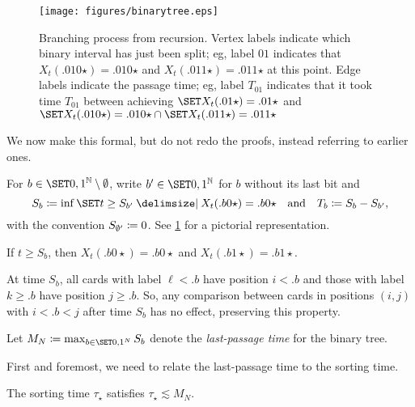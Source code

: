 \documentclass{article}
\newcommand{\mstar}{\mathord\star}
\begin{document}
\begin{figure}
\centering
\texttt{[image: figures/binarytree.eps]}
\caption{Branching process from recursion.
	Vertex labels indicate which binary interval has just been split;
	eg, label $01$ indicates that $X_t(.010\mstar) = .010\mstar$ and $X_t(.011\mstar) = .011\mstar$ at this point.
	Edge labels indicate the passage time;
	eg, label $T_{01}$ indicates that it took time $T_{01}$ between achieving $\set{ X_t(.01\mstar) = .01\mstar }$ and $\set{ X_t(.010\mstar) = .010\mstar } \cap \set{ X_t(.011\mstar) = .011\mstar }$%
	}
\label{fig:unif:binarytree}
\end{figure}

We now make this formal, but do not redo the proofs, instead referring to earlier ones.

\begin{defn}
For $b \in \set{0,1}^\mbn \setminus \emptyset$, write $b' \in \set{0,1}^\mbn$ for $b$ without its last bit
and
\[
	S_b
\cq
	\inf\set{ t \ge S_{b'} \given X_t(.b0\star) = .b0\star }
\Qand
	T_b
\cq
	S_b - S_{b'},
\]
with the convention $S_{\emptyset'} \coloneqq 0$.
See \cref{fig:unif:binarytree} for a pictorial representation.
\end{defn}

\begin{lem}
\label{res:unif:preservation}
If $t \ge S_b$, then $X_t(.b0\star) = .b0\star$ and $X_t(.b1\star) = .b1\star$.
\end{lem}

\begin{Proof}
At time $S_b$, all cards with label $\ell < .b$ have position $i < .b$ and those with label $k \ge .b$ have position $j \ge .b$.
So, any comparison between cards in positions $(i,j)$ with $i < .b < j$ after time $S_b$ has no effect, preserving this property.
\end{Proof}

\begin{defn}
Let
\(
	M_N
\cq
	\max_{b \in \set{0,1}^N} S_b
\)
denote the \textit{last-passage time} for the binary tree.
\end{defn}

First and foremost, we need to relate the last-passage time to the sorting time.

\begin{lem}
\label{res:unif:lpp:sorting}
The sorting time $\tau_\star$ satisfies $\tau_\star \lesssim M_N$.
\end{lem}
\end{document}
